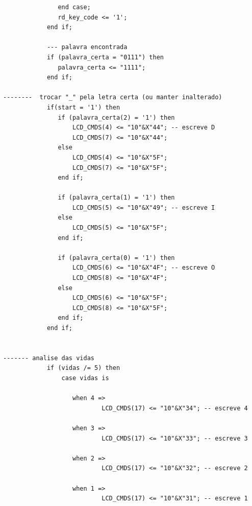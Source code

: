 \documentclass[a4paper,12pt,twoside]{article}
\begin{document}
\begin{lstlisting}
               end case;		
               rd_key_code <= '1'; 
            end if;
			
			--- palavra encontrada
            if (palavra_certa = "0111") then
               palavra_certa <= "1111";
            end if;
		
--------  trocar "_" pela letra certa (ou manter inalterado)
            if(start = '1') then
               if (palavra_certa(2) = '1') then
                   LCD_CMDS(4) <= "10"&X"44"; -- escreve D
                   LCD_CMDS(7) <= "10"&X"44";
               else 
                   LCD_CMDS(4) <= "10"&X"5F";	
                   LCD_CMDS(7) <= "10"&X"5F";
               end if;
        		
               if (palavra_certa(1) = '1') then
                   LCD_CMDS(5) <= "10"&X"49"; -- escreve I
               else 
                   LCD_CMDS(5) <= "10"&X"5F";
               end if;
        		
               if (palavra_certa(0) = '1') then
                   LCD_CMDS(6) <= "10"&X"4F"; -- escreve O
                   LCD_CMDS(8) <= "10"&X"4F";
               else 
                   LCD_CMDS(6) <= "10"&X"5F"; 
                   LCD_CMDS(8) <= "10"&X"5F";
               end if;
            end if;

		
------- analise das vidas 
            if (vidas /= 5) then
    			case vidas is
    			
                   when 4 => 
                           LCD_CMDS(17) <= "10"&X"34"; -- escreve 4
    	
                   when 3 =>
                           LCD_CMDS(17) <= "10"&X"33"; -- escreve 3
    		
                   when 2 =>
                           LCD_CMDS(17) <= "10"&X"32"; -- escreve 2	
    			
                   when 1 =>
                           LCD_CMDS(17) <= "10"&X"31"; -- escreve 1
    				

\end{lstlisting}
\end{document}

